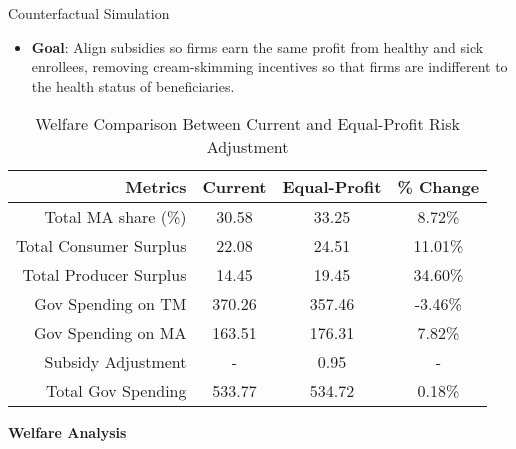\documentclass{beamer}
\begin{document}
\begin{frame}[t]
\begin{columns}[t]
\begin{column}{.45\textwidth}
\begin{block}{Counterfactual Simulation}
        \begin{itemize}
          \item \textbf{Goal}: Align subsidies so firms earn the same profit from healthy and sick enrollees, removing cream-skimming incentives so that firms are indifferent to the health status of beneficiaries.
        \end{itemize}
        
        \begin{table}[ht]
          \small
          \centering
          \caption{Welfare Comparison Between Current and Equal-Profit Risk Adjustment}
          \label{tab:counterfactual}
          \begin{threeparttable}
            \renewcommand{\arraystretch}{1.2}
            \begin{tabular}{@{}rccc@{}}
              \toprule
              \textbf{Metrics} & \textbf{Current} & \textbf{Equal-Profit} & \textbf{\% Change} \\ \midrule
              Total MA share (\%) & 30.58 & 33.25 & 8.72\% \\
              Total Consumer Surplus & 22.08 & 24.51 & 11.01\% \\
              Total Producer Surplus & 14.45 & 19.45 & 34.60\% \\
              Gov Spending on TM & 370.26 & 357.46 & -3.46\% \\
              Gov Spending on MA & 163.51 & 176.31 & 7.82\% \\
              Subsidy Adjustment & - & 0.95 & - \\
              Total Gov Spending & 533.77 & 534.72 & 0.18\% \\
              \bottomrule
            \end{tabular}
          \end{threeparttable}

        \end{table}
        \begin{center}
          \textbf{Welfare Analysis}
        \end{center}
        

\end{block}
\end{column}
\end{columns}
\end{frame}
\end{document}
